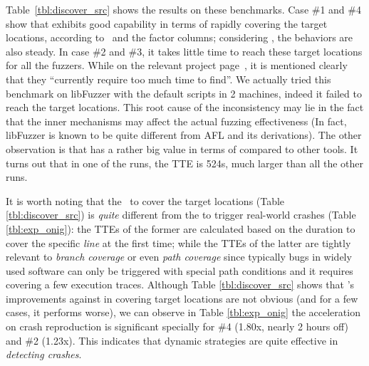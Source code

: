 Table~\ref{tbl:discover_src} shows the results on these benchmarks. 
Case \#1 and \#4 show that \dFOT exhibits good capability in terms of rapidly covering the target locations, according to {\utte}~and the factor columns; considering \alz, the behaviors are also steady. 
In case \#2 and \#3, it takes little time to reach these target locations for all the fuzzers.
While on the relevant project page~\cite{libpng-fts}, it is mentioned clearly that they ``currently require too much time to find''. 
We actually tried this benchmark on libFuzzer with the default scripts in 2 machines, indeed it failed to reach the target locations. 
This root cause of the inconsistency may lie in the fact that the inner mechanisms may affect the actual fuzzing effectiveness (In fact, libFuzzer is known to be quite different from AFL and its derivations). The other observation is that {{\dGO}} has a rather big value in terms of {\utte} compared to other tools. It turns out that in one of the runs, the TTE is 524s, much larger than all the other runs.

It is worth noting that the \utte~to cover the target locations (Table \ref{tbl:discover_src}) is \emph{quite} different from the {\utte} to trigger real-world crashes (Table \ref{tbl:exp_onig}): the TTEs of the former are calculated based on the duration to cover the specific \emph{line} at the first time; while the TTEs of the latter are tightly relevant to \emph{branch coverage} or even \emph{path coverage} since typically bugs in widely used software can only be triggered with special path conditions and it requires covering a few execution traces. Although Table \ref{tbl:discover_src} shows that \dFOT's improvements against \dGO in covering target locations are not obvious (and for a few cases, it performs worse), we can observe in Table \ref{tbl:exp_onig} the acceleration on crash reproduction is significant specially for \#4 (1.80x, nearly 2 hours off) and \#2 (1.23x). This indicates that dynamic strategies are quite effective in \emph{detecting crashes}.

